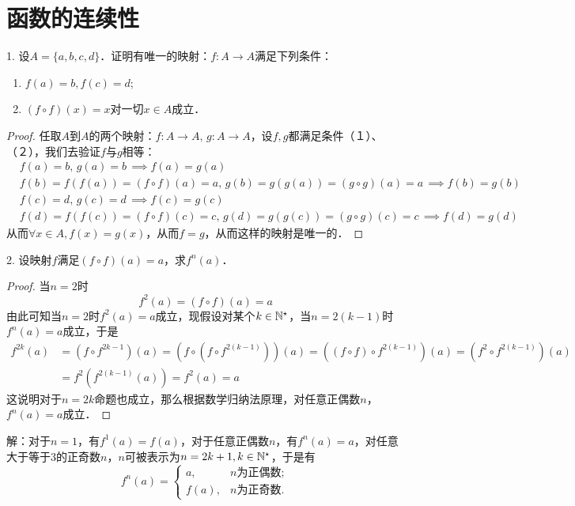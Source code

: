 
\section{函数的连续性}

\exercise

1. 设$A = \{ a, b, c, d \}$．证明有唯一的映射：$f: A \to A$满足下列条件：
\begin{enumerate}
    \item $f(a) = b, f(c) = d$;
    \item $( f \circ f ) (x) = x$对一切$x \in A$成立．
\end{enumerate}

\begin{proof}
任取$A$到$A$的两个映射：$f: A \to A, \, g: A \to A$，设$f, g$都满足条件（１）、（２），我们去验证$f$与$g$相等：
\begin{align}
    &f(a) = b, \, g(a) = b \, \implies f(a) = g(a) \\
    &f(b) = f(f(a)) = (f \circ f)(a) = a, \, g(b) = g(g(a)) = (g \circ g)(a) = a \, \implies f(b) = g(b) \\
    &f(c) = d, \, g(c) = d \, \implies f(c) = g(c) \\
    &f(d) = f(f(c)) = (f \circ f)(c) = c, \, g(d) = g(g(c)) = (g \circ g)(c) = c \, \implies f(d) = g(d)
\end{align}
从而$\forall x \in A, f(x) = g(x)$，从而$f = g$，从而这样的映射是唯一的．
\end{proof}

2. 设映射$f$满足$(f \circ f)(a) = a$，求$f^n (a)$．
\begin{proof}
当$n=2$时
\begin{equation}
    f^2 (a) = (f \circ f)(a) = a
\end{equation}
由此可知当$n=2$时$f^2 (a) = a$成立，现假设对某个$k \in \mathbb{N}^\star$，当$n = 2(k-1)$时$f^n (a) = a$成立，于是
\begin{align}
f^{2k} (a) &= (f \circ f^{2k-1}) (a) = (f \circ (f \circ f^{2(k-1)}))(a) = ((f \circ f) \circ f^{2(k-1)})(a) = (f^2 \circ f^{2(k-1)})(a) \\
&= f^2 (f^{2(k-1)}(a)) = f^2 (a) = a
\end{align}
这说明对于$n = 2k$命题也成立，那么根据数学归纳法原理，对任意正偶数$n$，$f^n (a) = a$成立．
\end{proof}

解：对于$n=1$，有$f^1 (a) = f(a)$，对于任意正偶数$n$，有$f^n (a) = a$，对任意大于等于$3$的正奇数$n$，$n$可被表示为$n=2k+1, k \in \mathbb{N}^\star$，于是有
\begin{equation}
    f^{n}(a) = \begin{cases}
        a, & n\text{为正偶数}; \\
        f(a), & n\text{为正奇数}.
    \end{cases}
\end{equation}

